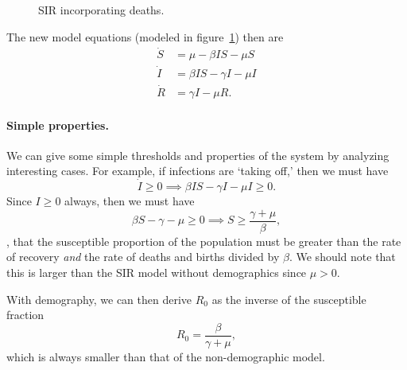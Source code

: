 \documentclass[12pt]{article}
\begin{document}
\begin{figure}[ht!]
\centering
{}
\caption{SIR incorporating deaths.}
\label{fig:sir-deaths}
\end{figure}

The new model equations (modeled in figure~\ref{fig:sir-deaths}) then are
\[
\begin{aligned}
    \dot S &= \mu - \beta IS - \mu S\\
    \dot I &= \beta IS - \gamma I - \mu I\\
    \dot R &= \gamma I  - \mu R.
\end{aligned}
\]

\paragraph{Simple properties.} We can give some simple thresholds and properties
of the system by analyzing interesting cases. For example, if infections are
`taking off,' then we must have
\[
    \dot I \ge 0 \implies \beta IS - \gamma I - \mu I \ge 0.
\]
Since $I \ge 0$ always, then we must have
\begin{equation}\label{eq:taking-off}
    \beta S - \gamma - \mu \ge 0 \implies S \ge \frac{\gamma + \mu}{\beta},
\end{equation}
\ie, that the susceptible proportion of the population must be greater than the
rate of recovery \emph{and} the rate of deaths and births divided by
$\beta$. We should note that this is larger than the SIR model without demographics since $\mu > 0$.

With demography, we can then derive $R_0$ as the inverse of the susceptible
fraction
\[
    R_0 = \frac{\beta}{\gamma + \mu},
\]
which is always smaller than that of the non-demographic model.
\end{document}
